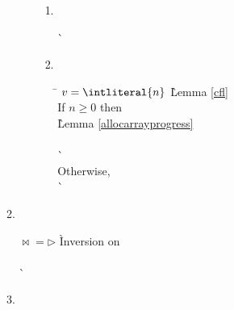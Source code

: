 \begin{enumerate}
\begin{enumerate}
\begin{enumerate}
\begin{enumerate}
      \item {} \ \\

        \begin{tabbing}
          \`  \\
        \end{tabbing}

      \item {} \ \\
        \begin{tabbing}
        \hspace{2em} \= \kill
        $v = \intliteral{n}$
          \` Lemma \ref{cfl} \\
        If $n \ge 0$ then \+ \\
            \` Lemma \ref{allocarrayprogress} \\
           \\
            \`  \- \\
        Otherwise,  \\
          \`  \\
        \end{tabbing}

      \end{enumerate}

    \end{enumerate}

  \item {} \ \\

    \begin{tabbing}
    $\bowtie = \rhd$
      \` Inversion on  \\
     \\
      \`  \\
    \end{tabbing}

  \item {} \ \\


\end{enumerate}
\end{enumerate}
